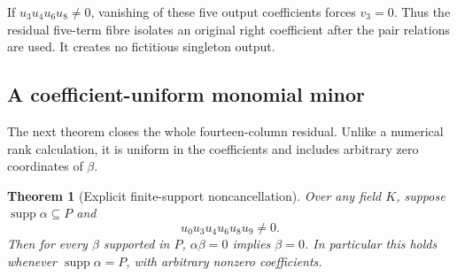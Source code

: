 \documentclass[11pt,a4paper,oneside]{report}
\newtheorem{theorem}{Theorem}[section]
\theoremstyle{definition}
\theoremstyle{remark}
\DeclareMathOperator{\supp}{supp}
\begin{document}
If $u_3u_4u_6u_8\ne0$, vanishing of these five output
coefficients forces $v_3=0$. Thus the residual five-term fibre
isolates an original right coefficient after the pair relations
are used. It creates no fictitious singleton output.

\subsection{A coefficient-uniform monomial minor}

The next theorem closes the whole fourteen-column residual.
Unlike a numerical rank calculation, it is uniform in the
coefficients and includes arbitrary zero coordinates of $\beta$.

\begin{theorem}[Explicit finite-support noncancellation]\label{M06:thm:minor}
Over any field $K$, suppose $\supp\alpha\subseteq P$ and
\[
u_0u_3u_4u_6u_8u_9\ne0.
\]
Then for every $\beta$ supported in $P$,
$\alpha\beta=0$ implies $\beta=0$. In particular this holds
whenever $\supp\alpha=P$, with arbitrary nonzero coefficients.
\end{theorem}
\end{document}
